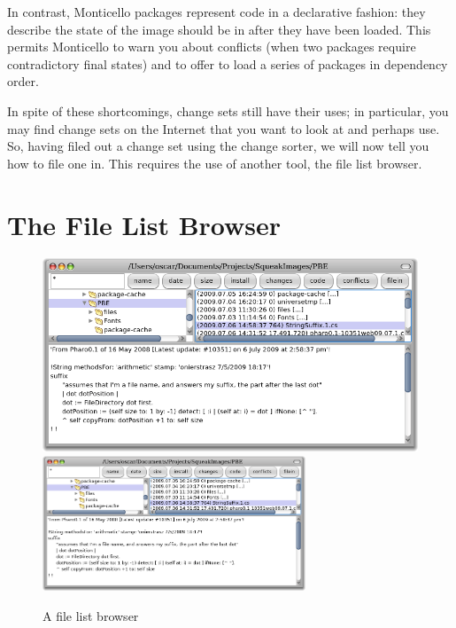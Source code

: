 \documentclass[a4paper,10pt,twoside]{book}
\begin{document}
In contrast, Monticello packages represent code in a declarative fashion: they describe the state of the image should be in after they have been loaded.
This permits Monticello to warn you about conflicts (when two packages require contradictory final states)
and to offer to load a series of packages in dependency order.

In spite of these shortcomings, change sets still have their uses; in particular, you may find change sets on the Internet that you want to look at and perhaps use.
So, having filed out a change set using the change sorter, we will now tell you how to file one in.
This requires the use of another tool, the file list browser.


\section{The File List Browser}

\begin{figure}[btp]
	\begin{center}
	\ifluluelse
		{\includegraphics[width=\textwidth]{fileList}}
		{\includegraphics[width=0.7\textwidth]{fileList}}
	\end{center}
	\caption{A file list browser}
\end{figure}
\end{document}
